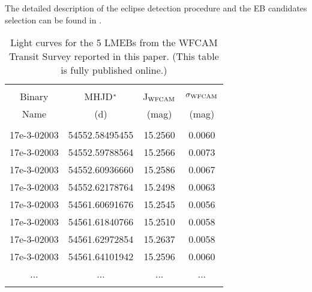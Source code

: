 \documentclass[fleqn,usenatbib]{mnras}
\begin{document}
The detailed description of the eclipse detection procedure and the EB candidates selection can be found in \citet{Birkby12,Kovacs13}.


\begin{table}%
\begin{center}
\caption{Light curves for the 5 LMEBs from the WFCAM Transit Survey reported in this paper. (This table is fully published online.)}
\label{photAllEBs}
\begin{tabular}{cccc}
\hline \hline \\ [-3ex]
Binary & MHJD$^{ \rm *}$ & J$_{\rm WFCAM}$ & $\sigma_{\rm WFCAM}$ \\
Name  & (d) & (mag) & (mag)  \\

\hline\\  [-2ex]

17e-3-02003 & 54552.58495455 & 15.2560 & 0.0060 \\ 
17e-3-02003 & 54552.59788564 & 15.2566 & 0.0073 \\ 
17e-3-02003 & 54552.60936660 & 15.2586 & 0.0067 \\ 
17e-3-02003 & 54552.62178764 & 15.2498 & 0.0063 \\ 
17e-3-02003 & 54561.60691676 & 15.2545 & 0.0056 \\ 
17e-3-02003 & 54561.61840766 & 15.2510 & 0.0058 \\ 
17e-3-02003 & 54561.62972854 & 15.2637 & 0.0058 \\ 
17e-3-02003 & 54561.64101942 & 15.2596 & 0.0060 \\ 
... & ... & ... & ... \\
\\  [-1ex]


\end{tabular}
\end{center}
\end{table}
\end{document}
